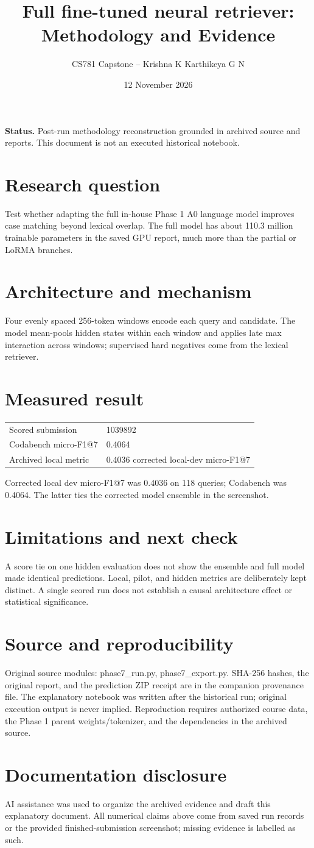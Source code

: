 \documentclass[11pt,a4paper]{article}
\title{Full fine-tuned neural retriever: Methodology and Evidence}
\author{CS781 Capstone -- Krishna K Karthikeya G N}
\date{12 November 2026}
\begin{document}
\maketitle
\noindent\textbf{Status.} Post-run methodology reconstruction grounded in archived source and reports. This document is not an executed historical notebook.\par
\section*{Research question}
Test whether adapting the full in-house Phase 1 A0 language model improves case matching beyond lexical overlap. The full model has about 110.3 million trainable parameters in the saved GPU report, much more than the partial or LoRMA branches.
\section*{Architecture and mechanism}
Four evenly spaced 256-token windows encode each query and candidate. The model mean-pools hidden states within each window and applies late max interaction across windows; supervised hard negatives come from the lexical retriever.
\section*{Measured result}
\begin{center}\begin{tabular}{ll}Scored submission & 1039892\\
Codabench micro-F1@7 & 0.4064\\
Archived local metric & 0.4036 corrected local-dev micro-F1@7\end{tabular}\end{center}
Corrected local dev micro-F1@7 was 0.4036 on 118 queries; Codabench was 0.4064. The latter ties the corrected model ensemble in the screenshot.
\section*{Limitations and next check}
A score tie on one hidden evaluation does not show the ensemble and full model made identical predictions. Local, pilot, and hidden metrics are deliberately kept distinct. A single scored run does not establish a causal architecture effect or statistical significance.
\section*{Source and reproducibility}
Original source modules: phase7\_run.py, phase7\_export.py. SHA-256 hashes, the original report, and the prediction ZIP receipt are in the companion provenance file. The explanatory notebook was written after the historical run; original execution output is never implied. Reproduction requires authorized course data, the Phase 1 parent weights/tokenizer, and the dependencies in the archived source.
\section*{Documentation disclosure}
AI assistance was used to organize the archived evidence and draft this explanatory document. All numerical claims above come from saved run records or the provided finished-submission screenshot; missing evidence is labelled as such.
\end{document}
